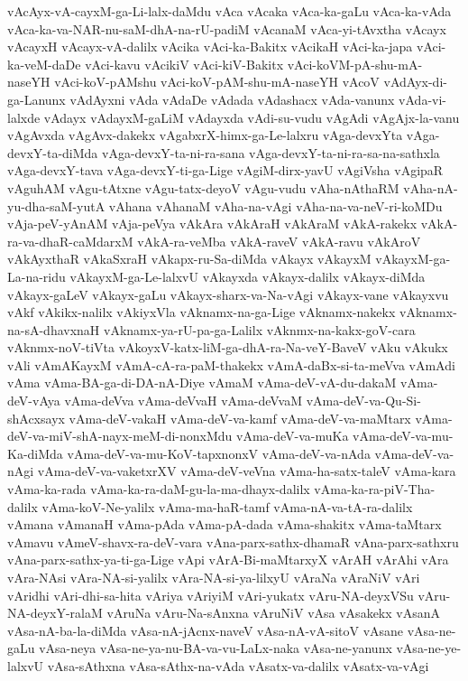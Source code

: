 {vAcAyx-vA-cayxM-ga-Li-lalx-daMdu
vAca
vAcaka
vAca-ka-gaLu
vAca-ka-vAda
vAca-ka-va-NAR-nu-saM-dhA-na-rU-padiM
vAcanaM
vAca-yi-tAvxtha
vAcayx
vAcayxH
vAcayx-vA-dalilx
vAcika
vAci-ka-Bakitx
vAcikaH
vAci-ka-japa
vAci-ka-veM-daDe
vAci-kavu
vAcikiV
vAci-kiV-Bakitx
vAci-koVM-pA-shu-mA-naseYH
vAci-koV-pAMshu
vAci-koV-pAM-shu-mA-naseYH
vAcoV
vAdAyx-di-ga-Lanunx
vAdAyxni
vAda
vAdaDe
vAdada
vAdashacx
vAda-vanunx
vAda-vi-lalxde
vAdayx
vAdayxM-gaLiM
vAdayxda
vAdi-su-vudu
vAgAdi
vAgAjx-la-vanu
vAgAvxda
vAgAvx-dakekx
vAgabxrX-himx-ga-Le-lalxru
vAga-devxYta
vAga-devxY-ta-diMda
vAga-devxY-ta-ni-ra-sana
vAga-devxY-ta-ni-ra-sa-na-sathxla
vAga-devxY-tava
vAga-devxY-ti-ga-Lige
vAgiM-dirx-yavU
vAgiVsha
vAgipaR
vAguhAM
vAgu-tAtxne
vAgu-tatx-deyoV
vAgu-vudu
vAha-nAthaRM
vAha-nA-yu-dha-saM-yutA
vAhana
vAhanaM
vAha-na-vAgi
vAha-na-va-neV-ri-koMDu
vAja-peV-yAnAM
vAja-peVya
vAkAra
vAkAraH
vAkAraM
vAkA-rakekx
vAkA-ra-va-dhaR-caMdarxM
vAkA-ra-veMba
vAkA-raveV
vAkA-ravu
vAkAroV
vAkAyxthaR
vAkaSxraH
vAkapx-ru-Sa-diMda
vAkayx
vAkayxM
vAkayxM-ga-La-na-ridu
vAkayxM-ga-Le-lalxvU
vAkayxda
vAkayx-dalilx
vAkayx-diMda
vAkayx-gaLeV
vAkayx-gaLu
vAkayx-sharx-va-Na-vAgi
vAkayx-vane
vAkayxvu
vAkf
vAkikx-nalilx
vAkiyxVla
vAknamx-na-ga-Lige
vAknamx-nakekx
vAknamx-na-sA-dhavxnaH
vAknamx-ya-rU-pa-ga-Lalilx
vAknmx-na-kakx-goV-cara
vAknmx-noV-tiVta
vAkoyxV-katx-liM-ga-dhA-ra-Na-veY-BaveV
vAku
vAkukx
vAli
vAmAKayxM
vAmA-cA-ra-paM-thakekx
vAmA-daBx-si-ta-meVva
vAmAdi
vAma
vAma-BA-ga-di-DA-nA-Diye
vAmaM
vAma-deV-vA-du-dakaM
vAma-deV-vAya
vAma-deVva
vAma-deVvaH
vAma-deVvaM
vAma-deV-va-Qu-Si-shAcxsayx
vAma-deV-vakaH
vAma-deV-va-kamf
vAma-deV-va-maMtarx
vAma-deV-va-miV-shA-nayx-meM-di-nonxMdu
vAma-deV-va-muKa
vAma-deV-va-mu-Ka-diMda
vAma-deV-va-mu-KoV-tapxnonxV
vAma-deV-va-nAda
vAma-deV-va-nAgi
vAma-deV-va-vaketxrXV
vAma-deV-veVna
vAma-ha-satx-taleV
vAma-kara
vAma-ka-rada
vAma-ka-ra-daM-gu-la-ma-dhayx-dalilx
vAma-ka-ra-piV-Tha-dalilx
vAma-koV-Ne-yalilx
vAma-ma-haR-tamf
vAma-nA-va-tA-ra-dalilx
vAmana
vAmanaH
vAma-pAda
vAma-pA-dada
vAma-shakitx
vAma-taMtarx
vAmavu
vAmeV-shavx-ra-deV-vara
vAna-parx-sathx-dhamaR
vAna-parx-sathxru
vAna-parx-sathx-ya-ti-ga-Lige
vApi
vArA-Bi-maMtarxyX
vArAH
vArAhi
vAra
vAra-NAsi
vAra-NA-si-yalilx
vAra-NA-si-ya-lilxyU
vAraNa
vAraNiV
vAri
vAridhi
vAri-dhi-sa-hita
vAriya
vAriyiM
vAri-yukatx
vAru-NA-deyxVSu
vAru-NA-deyxY-ralaM
vAruNa
vAru-Na-sAnxna
vAruNiV
vAsa
vAsakekx
vAsanA
vAsa-nA-ba-la-diMda
vAsa-nA-jAcnx-naveV
vAsa-nA-vA-sitoV
vAsane
vAsa-ne-gaLu
vAsa-neya
vAsa-ne-ya-nu-BA-va-vu-LaLx-naka
vAsa-ne-yanunx
vAsa-ne-ye-lalxvU
vAsa-sAthxna
vAsa-sAthx-na-vAda
vAsatx-va-dalilx
vAsatx-va-vAgi
}
